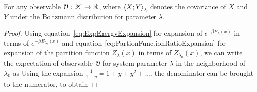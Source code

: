 \documentclass[letterpaper,english,10pt]{article}
\begin{document}
\begin{thm}
For any observable $\mathcal{O}: \mathscr{X} \to \mathbb{R}$,
where $\left\langle X; Y \right\rangle_{\lambda}$ denotes the covariance of $X$ and $Y$ under the Boltzmann distribution for parameter $\lambda$.
\end{thm}
\begin{proof}
Using equation~\eqref{eq:ExpEnergyExpansion} for expansion of $e^{-\beta E_\lambda(x)}$ in terms of $e^{-\beta E_{\lambda_0}(x)}$ and equation~\eqref{eq:PartionFunctionRatioExpansion} for expansion of the partition function $Z_\lambda(x)$ in terms of $Z_{\lambda_0}(x)$,  
we can write the expectation of observable $\mathcal{O}$ for system parameter $\lambda$ in the neighborhood of $\lambda_0$ as 
Using the expansion $\frac{1}{1-y} = 1 + y + y^2 + ...$, the denominator can be brought to the numerator, to obtain
\end{proof}
\end{document}

